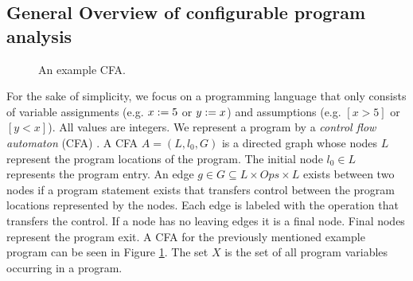 \subsection{General Overview of configurable program analysis}
\begin{figure}
\lstset{numbers=left}
\begin{subfigure}[b]{.48\textwidth}

\end{subfigure}%
\hfill
\begin{subfigure}[b]{.48\textwidth}
\end{subfigure}
\caption{An example CFA.}
\label{fig:exCFA}
\end{figure}

For the sake of simplicity, we focus on a programming language that only consists of variable assignments (e.g. $x := 5$ or $y := x$) and assumptions (e.g. $[x > 5]$ or $[y < x]$).
All values are integers.
We represent a program by a \emph{control flow automaton} (CFA) \cite{BeyerBook}\cite{Beyer2012}.
A CFA $A = (L, l_0, G)$ is a directed graph whose nodes $L$ represent the program locations of the program.
The initial node $l_0 \in L$ represents the program entry.
An edge $g \in G \subseteq L \times Ops \times L$ exists between two nodes if a program statement exists that transfers control between the program locations represented by the nodes.
Each edge is labeled with the operation that transfers the control.
If a node has no leaving edges it is a final node. Final nodes represent the program exit.
A CFA for the previously mentioned example program can be seen in Figure \ref{fig:exCFA}.
The set $X$ is the set of all program variables occurring in a program.

